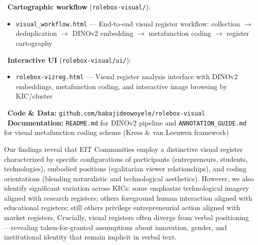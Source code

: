 \documentclass[../main.tex]{subfiles}
\begin{document}
\begin{replicationbox}
\faLaptopCode\ \textbf{Cartographic workflow} (\texttt{rolebox-visual/}):
\begin{itemize}[leftmargin=*, itemsep=0.1em]
    \item \texttt{visual\_workflow.html} --- End-to-end visual register workflow: collection $\rightarrow$ deduplication $\rightarrow$ DINOv2 embedding $\rightarrow$ metafunction coding $\rightarrow$ register cartography
\end{itemize}
\faLaptopCode\ \textbf{Interactive UI} (\texttt{rolebox-visual/ui/}):
\begin{itemize}[leftmargin=*, itemsep=0.1em]
    \item \texttt{rolebox-vizreg.html} --- Visual register analysis interface with DINOv2 embeddings, metafunction coding, and interactive image browsing by KIC/cluster
\end{itemize}
\faGithub\ \textbf{Code \& Data:} \texttt{github.com/babajideowoyele/rolebox-visual}\\
\faBook\ \textbf{Documentation:} \texttt{README.md} for DINOv2 pipeline and \texttt{ANNOTATION\_GUIDE.md} for visual metafunction coding scheme (Kress \& van Leeuwen framework)
\end{replicationbox}

Our findings reveal that EIT Communities employ a distinctive visual register characterized by specific configurations of participants (entrepreneurs, students, technologies), embodied positions (egalitarian viewer relationships), and coding orientations (blending naturalistic and technological aesthetics). However, we also identify significant variation across KICs: some emphasize technological imagery aligned with research registers; others foreground human interaction aligned with educational registers; still others privilege entrepreneurial action aligned with market registers. Crucially, visual registers often diverge from verbal positioning---revealing taken-for-granted assumptions about innovation, gender, and institutional identity that remain implicit in verbal text.
\end{document}
